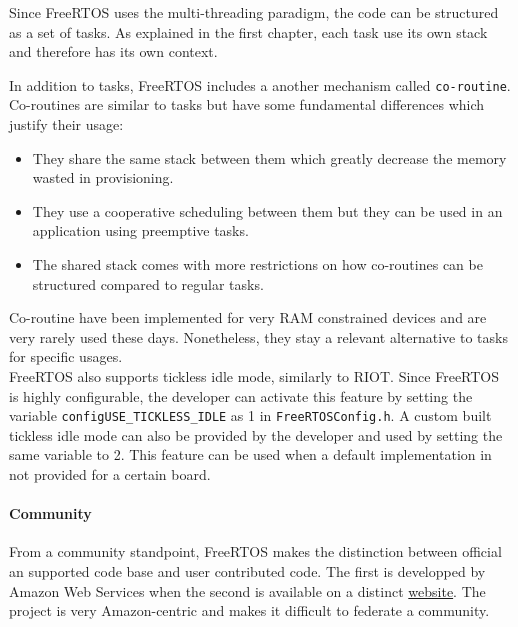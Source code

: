 Since FreeRTOS uses the multi-threading paradigm, the code can be structured as a set of tasks.
As explained in the first chapter, each task use its own stack and therefore has its own context.

In addition to tasks, FreeRTOS includes a another mechanism called \texttt{co-routine}\cite{freertos-tasks-coroutines}\cite{freertos-tasks-coroutines2}.
Co-routines are similar to tasks but have some fundamental differences which justify their usage:
\begin{itemize}
    \item They share the same stack between them which greatly decrease the memory wasted in provisioning.
    \item They use a cooperative scheduling between them but they can be used in an application using preemptive tasks.
    \item The shared stack comes with more restrictions on how co-routines can be structured compared to regular tasks.
\end{itemize}
Co-routine have been implemented for very RAM constrained devices and are very rarely used these days.
Nonetheless, they stay a relevant alternative to tasks for specific usages.\\
FreeRTOS also supports tickless idle mode, similarly to RIOT.
Since FreeRTOS is highly configurable, the developer can activate this feature 
    by setting the variable \texttt{configUSE\_TICKLESS\_IDLE} as 1 in \texttt{FreeRTOSConfig.h}.
A custom built tickless idle mode can also be provided by the developer and used by setting the same variable to 2.
This feature can be used when a default implementation in not provided for a certain board.

\paragraph{Community} From a community standpoint, FreeRTOS makes the distinction between official an supported code base and user contributed code.
The first is developped by Amazon Web Services when the second is available on a distinct \href{https://interactive.freertos.org/hc/en-us}{website}.%
The project is very Amazon-centric and makes it difficult to federate a community.